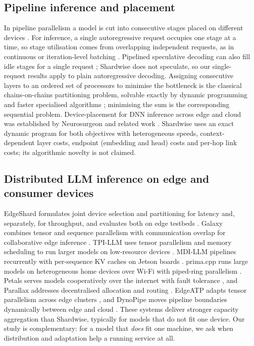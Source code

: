 \documentclass[preprint,12pt]{elsarticle}
\begin{document}
\hypertarget{pipeline-inference-and-placement}{%
\subsection{Pipeline inference and
placement}\label{pipeline-inference-and-placement}}

In pipeline parallelism a model is cut into consecutive stages placed on
different devices \citep{huang2019gpipe, narayanan2019pipedream}. For
inference, a single autoregressive request occupies one stage at a time,
so stage utilisation comes from overlapping independent requests, as in
continuous or iteration-level batching \citep{yu2022orca, kwon2023vllm}.
Pipelined speculative decoding can also fill idle stages for a single
request \citep{pipeinfer2024, flowspec2025}; Shardwise does not
speculate, so our single-request results apply to plain autoregressive
decoding. Assigning consecutive layers to an ordered set of processors
to minimise the bottleneck is the classical chains-on-chains
partitioning problem, solvable exactly by dynamic programming and faster
specialised algorithms
\citep{bokhari1988partitioning, pinar2004partitioning}; minimising the
sum is the corresponding sequential problem. Device-placement for DNN
inference across edge and cloud was established by Neurosurgeon and
related work \citep{kang2017neurosurgeon, li2020edgeai}. Shardwise uses
an exact dynamic program for both objectives with heterogeneous speeds,
context-dependent layer costs, endpoint (embedding and head) costs and
per-hop link costs; its algorithmic novelty is not claimed.

\hypertarget{distributed-llm-inference-on-edge-and-consumer-devices}{%
\subsection{Distributed LLM inference on edge and consumer
devices}\label{distributed-llm-inference-on-edge-and-consumer-devices}}

EdgeShard formulates joint device selection and partitioning for latency
and, separately, for throughput, and evaluates both on edge testbeds
\citep{edgeshard2025}. Galaxy combines tensor and sequence parallelism
with communication overlap for collaborative edge inference
\citep{galaxy2024}. TPI-LLM uses tensor parallelism and memory
scheduling to run larger models on low-resource devices \citep{tpi2025}.
MDI-LLM pipelines recurrently with per-sequence KV caches on Jetson
boards \citep{mdi2025}. prima.cpp runs large models on heterogeneous
home devices over Wi-Fi with piped-ring parallelism \citep{prima2026}.
Petals serves models cooperatively over the internet with fault
tolerance \citep{borzunov2023petals}, and Parallax addresses
decentralised allocation and routing \citep{tong2025parallax}. EdgeATP
adapts tensor parallelism across edge clusters \citep{wang2026edgeatp},
and DynoPipe moves pipeline boundaries dynamically between edge and
cloud \citep{lin2026dynopipe}. These systems deliver stronger capacity
aggregation than Shardwise, typically for models that do not fit one
device. Our study is complementary: for a model that \emph{does} fit one
machine, we ask when distribution and adaptation help a running service
at all.
\end{document}
